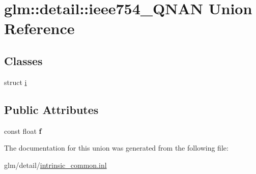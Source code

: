\hypertarget{unionglm_1_1detail_1_1ieee754__QNAN}{\section{glm\-:\-:detail\-:\-:ieee754\-\_\-\-Q\-N\-A\-N Union Reference}
\label{unionglm_1_1detail_1_1ieee754__QNAN}
}
\subsection*{Classes}
\begin{DoxyCompactItemize}
\item 
struct \hyperlink{structglm_1_1detail_1_1ieee754__QNAN_1_1i}{i}
\end{DoxyCompactItemize}
\subsection*{Public Attributes}
\begin{DoxyCompactItemize}
\item 
\hypertarget{unionglm_1_1detail_1_1ieee754__QNAN_ac5f04f4e605e4d08ddc2bacddf7eee65}{const float {\bfseries f}}\label{unionglm_1_1detail_1_1ieee754__QNAN_ac5f04f4e605e4d08ddc2bacddf7eee65}

\end{DoxyCompactItemize}


The documentation for this union was generated from the following file\-:\begin{DoxyCompactItemize}
\item 
glm/detail/\hyperlink{intrinsic__common_8inl}{intrinsic\-\_\-common.\-inl}\end{DoxyCompactItemize}
